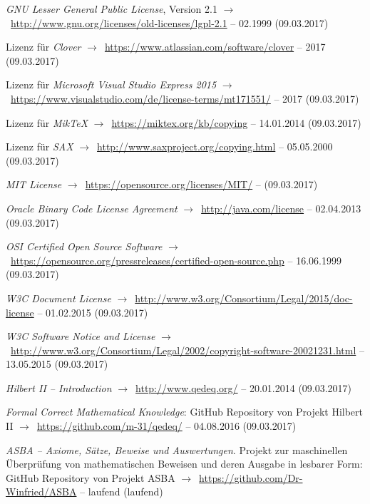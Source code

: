 \documentclass[english,ngerman,parskip=half,headsepline,footsepline]{scrreprt}
\begin{document}
\begin{flushleft}
\begin{thebibliography}{12}
			\emph{GNU Lesser General Public License}, Version 2.1 $\rightarrow$~\url{http://www.gnu.org/licenses/old-licenses/lgpl-2.1} -- 02.1999 (09.03.2017)

			Lizenz für \emph{Clover} $\rightarrow$~\url{https://www.atlassian.com/software/clover} -- 2017 (09.03.2017)

			Lizenz für \emph{Microsoft Visual Studio Express 2015} $\rightarrow$~\url{https://www.visualstudio.com/de/license-terms/mt171551/} -- 2017 (09.03.2017)

			Lizenz für \emph{MikTeX} $\rightarrow$~\url{https://miktex.org/kb/copying} -- 14.01.2014 (09.03.2017)

			Lizenz für \emph{SAX} $\rightarrow$~\url{http://www.saxproject.org/copying.html} -- 05.05.2000 (09.03.2017)

			\emph{MIT License} $\rightarrow$~\url{https://opensource.org/licenses/MIT/} -- (09.03.2017)

			\emph{Oracle Binary Code License Agreement} $\rightarrow$~\url{http://java.com/license} -- 02.04.2013 (09.03.2017)

			\emph{OSI Certified Open Source Software} $\rightarrow$~\url{https://opensource.org/pressreleases/certified-open-source.php} -- 16.06.1999 (09.03.2017)

			\emph{W3C Document License} $\rightarrow$~\url{http://www.w3.org/Consortium/Legal/2015/doc-license} -- 01.02.2015 (09.03.2017)

			\emph{W3C Software Notice and License} $\rightarrow$~\url{http://www.w3.org/Consortium/Legal/2002/copyright-software-20021231.html} -- 13.05.2015 (09.03.2017)

			\emph{Hilbert II -- Introduction} $\rightarrow$~\url{http://www.qedeq.org/} -- 20.01.2014 (09.03.2017)

			\emph{Formal Correct Mathematical Knowledge}: GitHub Repository von Projekt Hilbert II $\rightarrow$~\url{https://github.com/m-31/qedeq/} -- 04.08.2016 (09.03.2017)

			\emph{ASBA -- Axiome, Sätze, Beweise und Auswertungen}.
			Projekt zur maschinellen Überprüfung von mathematischen Beweisen und deren Ausgabe in lesbarer Form: GitHub Repository von Projekt ASBA $\rightarrow$~\url{https://github.com/Dr-Winfried/ASBA} -- laufend (laufend)


\end{thebibliography}
\end{flushleft}
\end{document}
